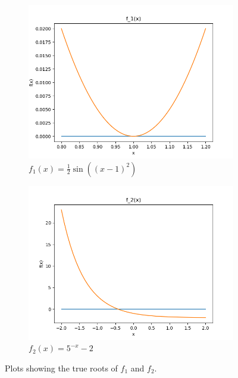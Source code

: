\documentclass[a4paper,12pt]{article}
\begin{document}
\begin{figure}[H]
    \centering
	\begin{subfigure}[b]{0.49\textwidth}
	    \centering
	    \includegraphics[width=\textwidth]{img/report1/f1.png}
	    \caption{$f_1(x) = \frac{1}{2}\sin((x - 1)^2)$}
	    \label{fig:0}
	\end{subfigure}
	\hfill
	\begin{subfigure}[b]{0.49\textwidth}
	    \centering
	     \includegraphics[width=\textwidth]{img/report1/f2.png}
	     \caption{$f_2(x) = 5^{-x} - 2$}
	     \label{fig:1}
	\end{subfigure}
	\caption{Plots showing the true roots of $f_1$ and $f_2$.}
\end{figure}
\end{document}
